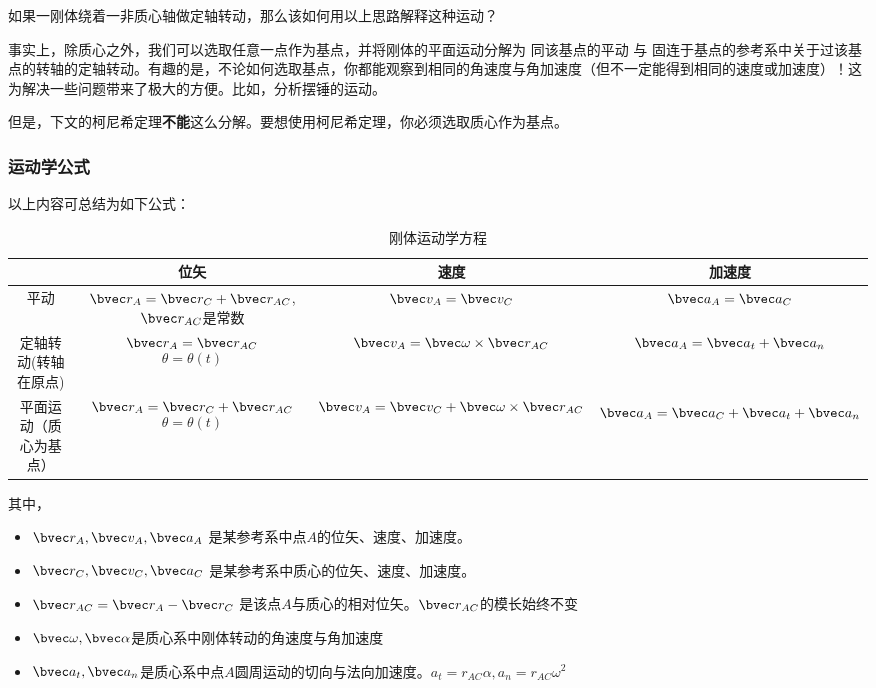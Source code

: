 \begin{exercise}{}
如果一刚体绕着一非质心轴做定轴转动，那么该如何用以上思路解释这种运动？
\end{exercise}

事实上，除质心之外，我们可以选取任意一点作为基点，并将刚体的平面运动分解为 同该基点的平动 与 固连于基点的参考系中关于过该基点的转轴的定轴转动。有趣的是，不论如何选取基点，你都能观察到相同的角速度与角加速度（但不一定能得到相同的速度或加速度）！这为解决一些问题带来了极大的方便。比如，分析摆锤的运动。

但是，下文的柯尼希定理\textbf{不能}这么分解。要想使用柯尼希定理，你必须选取质心作为基点。

\subsubsection{运动学公式}
以上内容可总结为如下公式：
\begin{table}[ht]
\centering
\caption{刚体运动学方程}\label{RGAB_tab2}
\begin{tabular}{|c|c|c|c|}
\hline
 & 位矢 & 速度  & 加速度 \\
\hline
平动 & $\bvec r_A = \bvec r_C + \bvec r_{AC}$, $\bvec r_{AC}$是常数 & $\bvec v_A = \bvec v_C$ & $\bvec a_A = \bvec a_C$ \\
\hline
定轴转动(转轴在原点) & $\bvec r_A = \bvec r_{AC}$ $$\theta =\theta (t) $$ & $\bvec v_A = \bvec \omega \times \bvec r_{AC}$ & $\bvec a_A = \bvec a_t + \bvec a_n$\\
\hline
平面运动（质心为基点） & $\bvec r_A = \bvec r_C + \bvec r_{AC}$ $$\theta =\theta (t) $$& $\bvec v_A = \bvec v_C + \bvec \omega \times \bvec r_{AC}$ & $$\bvec a_A = \bvec a_C + \bvec a_t + \bvec a_n$$ \\
\hline
\end{tabular}
\end{table}
其中，
\begin{itemize}
\item $\bvec r_A, \bvec v_A, \bvec a_A$ 是某参考系中点$A$的位矢、速度、加速度。
\item $\bvec r_C, \bvec v_C, \bvec a_C$ 是某参考系中质心的位矢、速度、加速度。
\item $\bvec r_{AC} = \bvec r_A -\bvec r_C $ 是该点$A$与质心的相对位矢。$\bvec r_{AC}$的模长始终不变
\item $\bvec \omega, \bvec \alpha$是质心系中刚体转动的角速度与角加速度 
\item $\bvec a_t, \bvec a_n$是质心系中点$A$圆周运动的切向与法向加速度。$a_t=r_{AC}\alpha, a_n=r_{AC}\omega^2$
 
\end{itemize}

